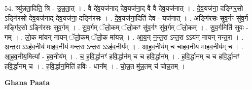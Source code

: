 \documentclass[17pt]{extarticle}
\begin{document}
54. त्र्यु॑न्नता॒दिति॒ त्रि - उ॒न्न॒ता॒त् । . वै दे॑व॒यज॑नाद् देव॒यज॑ना॒द् वै वै दे॑व॒यज॑नात् । . दे॒व॒यज॑ना॒ दङ्गि॑र॒सो ऽङ्गि॑रसो देव॒यज॑नाद् देव॒यज॑ना॒ दङ्गि॑रसः । . दे॒व॒यज॑ना॒दिति॑ देव - यज॑नात् । . अङ्गि॑रसः सुव॒र्गꣳ सु॑व॒र्ग मङ्गि॑र॒सो ऽङ्गि॑रसः सुव॒र्गम् । . सु॒व॒र्गम् ॅलो॒कम् ॅलो॒कꣳ सु॑व॒र्गꣳ सु॑व॒र्गम् ॅलो॒कम् । . सु॒व॒र्गमिति॑ सुवः - गम् । . लो॒क मा॑यन् नायन् ॅलो॒कम् ॅलो॒क मा॑यन्न् । . आ॒य॒न् न॒न्त॒रा ऽन्त॒रा ऽऽय॑न् नायन् नन्त॒रा । . अ॒न्त॒रा ऽऽह॑व॒नीय॑ माहव॒नीय॑ मन्त॒रा ऽन्त॒रा ऽऽह॑व॒नीय᳚म् । . आ॒ह॒व॒नीय॑म् च चाहव॒नीय॑ माहव॒नीय॑म् च । . आ॒ह॒व॒नीय॒मित्या᳚ - ह॒व॒नीय᳚म् । . च॒ ह॒वि॒र्द्धानꣳ॑ हवि॒र्द्धान॑म् च च हवि॒र्द्धान᳚म् । . ह॒वि॒र्द्धान॑म् च च हवि॒र्द्धानꣳ॑ हवि॒र्द्धान॑म् च । . ह॒वि॒र्द्धान॒मिति॑ हविः - धान᳚म् । . चो॒न्न॒त मु॑न्न॒तम् च॑ चोन्न॒तम् । \newline

\textbf{Ghana Paata } \newline
\end{document}
